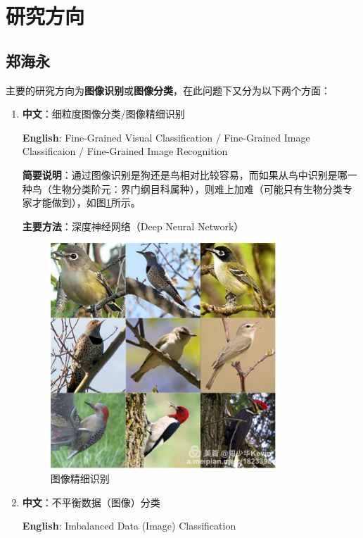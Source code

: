 \documentclass[14pt,a4paper]{extarticle}
\begin{document}
\section{研究方向}

\subsection{郑海永}

主要的研究方向为\textbf{图像识别}或\textbf{图像分类}，在此问题下又分为以下两个方面：
\begin{enumerate}
\item \textbf{中文}：细粒度图像分类/图像精细识别

\textbf{English}: Fine-Grained Visual Classification / Fine-Grained Image Classificaion / Fine-Grained Image Recognition

\textbf{简要说明}：通过图像识别是狗还是鸟相对比较容易，而如果从鸟中识别是哪一种鸟（生物分类阶元：界门纲目科属种），则难上加难（可能只有生物分类专家才能做到），如图\ref{fig:FGIR}所示。

\textbf{主要方法}：深度神经网络（Deep Neural Network）
\begin{figure}[!ht]
  \centering
  \includegraphics[width=0.8\textwidth]{FGIR.jpg}
  \caption{图像精细识别}
  \label{fig:FGIR} %
\end{figure}
\item \textbf{中文}：不平衡数据（图像）分类

\textbf{English}: Imbalanced Data (Image) Classification


\end{enumerate}
\end{document}

